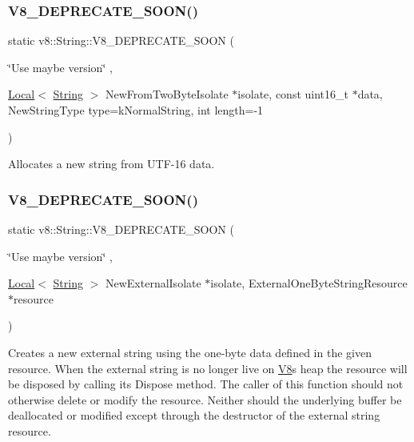 \subsubsection{\texorpdfstring{V8\+\_\+\+D\+E\+P\+R\+E\+C\+A\+T\+E\+\_\+\+S\+O\+O\+N()}{V8\_DEPRECATE\_SOON()}\hspace{0.1cm}{\footnotesize\ttfamily [2/3]}}
{\footnotesize\ttfamily static v8\+::\+String\+::\+V8\+\_\+\+D\+E\+P\+R\+E\+C\+A\+T\+E\+\_\+\+S\+O\+ON (\begin{DoxyParamCaption}\item[{\char`\"{}Use maybe version\char`\"{}}]{,  }\item[{\mbox{\hyperlink{classv8_1_1Local}{Local}}$<$ \mbox{\hyperlink{classv8_1_1String}{String}} $>$ }]{New\+From\+Two\+ByteIsolate $\ast$isolate, const uint16\+\_\+t $\ast$data, New\+String\+Type type=k\+Normal\+String, int length=-\/1 }\end{DoxyParamCaption})\hspace{0.3cm}{\ttfamily [static]}}

Allocates a new string from U\+T\+F-\/16 data. \mbox{\label{classv8_1_1String_ad7186b5cfdddffbee8235a7216f31a67}} 
\subsubsection{\texorpdfstring{V8\+\_\+\+D\+E\+P\+R\+E\+C\+A\+T\+E\+\_\+\+S\+O\+O\+N()}{V8\_DEPRECATE\_SOON()}\hspace{0.1cm}{\footnotesize\ttfamily [3/3]}}
{\footnotesize\ttfamily static v8\+::\+String\+::\+V8\+\_\+\+D\+E\+P\+R\+E\+C\+A\+T\+E\+\_\+\+S\+O\+ON (\begin{DoxyParamCaption}\item[{\char`\"{}Use maybe version\char`\"{}}]{,  }\item[{\mbox{\hyperlink{classv8_1_1Local}{Local}}$<$ \mbox{\hyperlink{classv8_1_1String}{String}} $>$ }]{New\+ExternalIsolate $\ast$isolate, External\+One\+Byte\+String\+Resource $\ast$resource }\end{DoxyParamCaption})\hspace{0.3cm}{\ttfamily [static]}}

Creates a new external string using the one-\/byte data defined in the given resource. When the external string is no longer live on \mbox{\hyperlink{classv8_1_1V8}{V8}}\textquotesingle{}s heap the resource will be disposed by calling its Dispose method. The caller of this function should not otherwise delete or modify the resource. Neither should the underlying buffer be deallocated or modified except through the destructor of the external string resource. 

